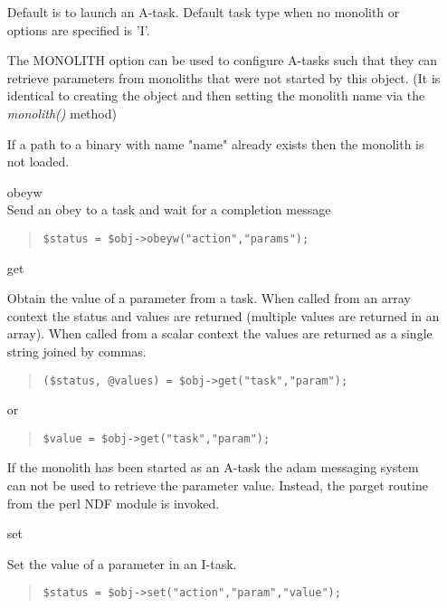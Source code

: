 \documentclass[twoside,11pt]{article}
\newenvironment{myquote}{\begin{quote}\begin{small}}{\end{small}\end{quote}}
\renewcommand{\_}{\texttt{\symbol{95}}}
\begin{document}
\begin{itemize}
Default is to launch an A-task. Default task type when no monolith
or options are specified is 'I'.

The MONOLITH option can be used to configure A-tasks such that 
they can retrieve parameters from monoliths that were not started by this 
object. (It is identical to creating the object and then setting the
monolith name via the {\em monolith()\/} method)

If a path to a binary with name "name" already exists then the monolith
is not loaded.

\item[obeyw]%
%
\hfil\\
Send an obey to a task and wait for a completion message
\begin{myquote}
\begin{verbatim}
$status = $obj->obeyw("action","params");
\end{verbatim}
\end{myquote}

\item[get]%
%

Obtain the value of a parameter from a task. 
When called from an array context the status and values are returned
(multiple values are returned in an array). When called from a scalar
context the values are returned as a single string joined by commas.

\begin{myquote}
\begin{verbatim}
($status, @values) = $obj->get("task","param");
\end{verbatim}
\end{myquote}
or
\begin{myquote}
\begin{verbatim}
$value = $obj->get("task","param");
\end{verbatim}
\end{myquote}

If the monolith has been started as an A-task the adam messaging
system can not be used to retrieve the parameter value. Instead,
the par\_{}get routine from the perl NDF module is invoked.

\item[set]%
%

Set the value of a parameter in an I-task.
\begin{myquote}
\begin{verbatim}
$status = $obj->set("action","param","value");
\end{verbatim}
\end{myquote}


\end{itemize}
\end{document}
